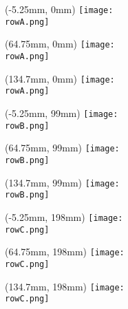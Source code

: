 \documentclass{article}
\def\rowA{pusher3}
\def\rowB{pusher3}
\def\rowC{pusher3}
\begin{document}
    \begin{textblock*}{0mm}(-5.25mm, 0mm)
        \texttt{[image: \\rowA.png]}
    \end{textblock*}
    
    \begin{textblock*}{0mm}(64.75mm, 0mm)
        \texttt{[image: \\rowA.png]}
    \end{textblock*}
    
    \begin{textblock*}{0mm}(134.7mm, 0mm)
        \texttt{[image: \\rowA.png]}
    \end{textblock*}

    \begin{textblock*}{0mm}(-5.25mm, 99mm)
        \texttt{[image: \\rowB.png]}
    \end{textblock*}
    
    \begin{textblock*}{0mm}(64.75mm, 99mm)
        \texttt{[image: \\rowB.png]}
    \end{textblock*}
    
    \begin{textblock*}{0mm}(134.7mm, 99mm)
        \texttt{[image: \\rowB.png]}
    \end{textblock*}

    \begin{textblock*}{0mm}(-5.25mm, 198mm)
        \texttt{[image: \\rowC.png]}
    \end{textblock*}
    
    \begin{textblock*}{0mm}(64.75mm, 198mm)
        \texttt{[image: \\rowC.png]}
    \end{textblock*}
    
    \begin{textblock*}{0mm}(134.7mm, 198mm)
        \texttt{[image: \\rowC.png]}
    \end{textblock*}
\end{document}
